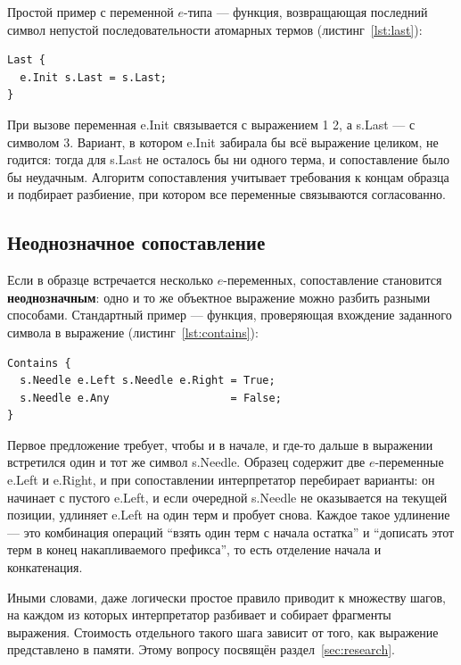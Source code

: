 \documentclass[14pt, russian]{scrartcl}
\renewcommand{\emph}[1]{#1}
\newcommand{\enq}[1]{\enquote{#1}}
\newcommand{\prog}[1]{{\ttfamily\small#1}}
\begin{document}
Простой пример с переменной \(e\)-типа --- функция, возвращающая последний
символ непустой последовательности атомарных термов (листинг~\ref{lst:last}):

\begin{lstlisting}[language=Refal,caption={Функция получения последнего символа},label={lst:last}]
Last {
  e.Init s.Last = s.Last;
}
\end{lstlisting}

При вызове \prog{<Last 1 2 3>} переменная \prog{e.Init} связывается с
выражением \prog{1 2}, а \prog{s.Last} --- с символом \prog{3}. Вариант, в
котором \prog{e.Init} забирала бы всё выражение целиком, не годится:
тогда для \prog{s.Last} не осталось бы ни одного терма, и сопоставление
было бы неудачным. Алгоритм сопоставления учитывает требования к концам
образца и подбирает разбиение, при котором все переменные связываются
согласованно.

\subsection{Неоднозначное сопоставление}
\label{sec:ambiguous-matching}

Если в образце встречается несколько \(e\)-переменных, сопоставление
становится \textbf{неоднозначным}: одно и то же объектное выражение можно
разбить разными способами. Стандартный пример --- функция, проверяющая
вхождение заданного символа в выражение (листинг~\ref{lst:contains}):

\begin{lstlisting}[language=Refal,caption={Неоднозначное сопоставление при поиске символа},label={lst:contains}]
Contains {
  s.Needle e.Left s.Needle e.Right = True;
  s.Needle e.Any                   = False;
}
\end{lstlisting}

Первое предложение требует, чтобы и в начале, и где-то дальше в выражении
встретился один и тот же символ \prog{s.Needle}. Образец содержит две
\(e\)-переменные \prog{e.Left} и \prog{e.Right}, и при сопоставлении
интерпретатор перебирает варианты: он начинает с пустого \prog{e.Left}, и
если очередной \prog{s.Needle} не оказывается на текущей позиции,
удлиняет \prog{e.Left} на один терм и пробует снова. Каждое такое
удлинение --- это комбинация операций \enq{взять один терм с начала
остатка} и \enq{дописать этот терм в конец накапливаемого префикса}, то
есть \emph{отделение начала} и \emph{конкатенация}.

Иными словами, даже логически простое правило приводит к множеству шагов,
на каждом из которых интерпретатор разбивает и собирает фрагменты
выражения. Стоимость отдельного такого шага зависит от того, как
выражение представлено в памяти. Этому вопросу посвящён
раздел~\ref{sec:research}.
\end{document}
